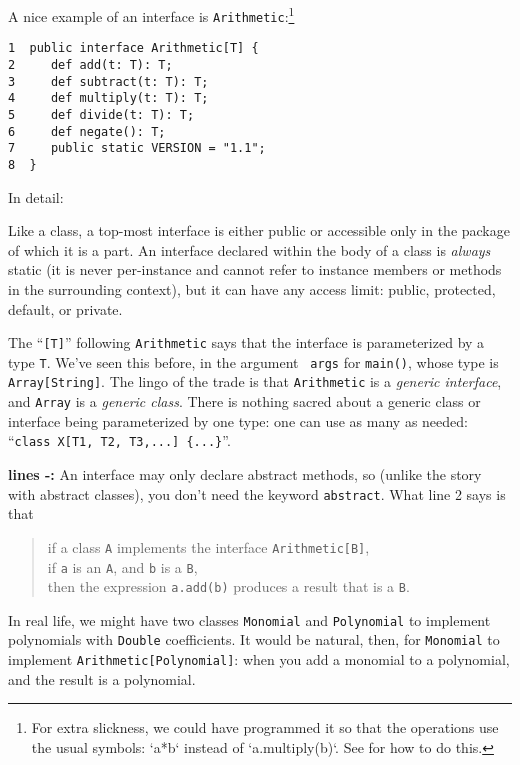 A nice example of an interface is {\tt Arithmetic}:\footnote{For extra
slickness, we could have programmed it so that the operations use the usual
symbols: \xcd`a*b` instead of \xcd`a.multiply(b)`.  See  for
how to do this.}
\begin{verbatim}
1  public interface Arithmetic[T] { 
2     def add(t: T): T; 
3     def subtract(t: T): T;
4     def multiply(t: T): T;
5     def divide(t: T): T;
6     def negate(): T;
7     public static VERSION = "1.1";
8  }
\end{verbatim}

In detail: 
\begin{description}
\item[line {\bf {}:}] 
Like a class, a top-most interface is either public or accessible only in the
package of which it is a part. An interface declared within the body of a
class is {\em always} static (it is never per-instance and cannot refer to
instance members or methods in the surrounding context), but it can have any
access limit: public, protected, default, or private.

The ``{\tt [T]}'' following {\tt Arithmetic} says that the interface is
parameterized by a type {\tt T}. We've seen this before, in the argument {\tt
  args} for {\tt main()}, whose type is {\tt Array[String]}. The lingo of the
trade is that {\tt Arithmetic} is a {\em generic interface}, and {\tt Array}
is a {\em generic class}. There is nothing sacred about a generic class or
interface being parameterized by one type: one can use as many as needed:
``{\tt class X[T1, T2, T3,...] \{...\}}''.


\item{\bf lines -:} An interface may only declare abstract methods, so (unlike the story
with abstract classes), you don't need the keyword {\tt abstract}.  What line 2 says is that
\begin{quote}
if a class {\tt A} implements the interface {\tt Arithmetic[B]},\\
if {\tt a} is an {\tt A}, and {\tt b} is a {\tt B}, \\
then the expression {\tt a.add(b)} produces a result that is a {\tt B}.
\end{quote}
In real life, we might have two classes {\tt Monomial} and {\tt Polynomial} to 
implement polynomials with {\tt Double} coefficients.  It would be natural, then,
for {\tt Monomial} to implement {\tt Arithmetic[Polynomial]}: when you add a monomial
to a polynomial, and the result is a polynomial.


\end{description}
